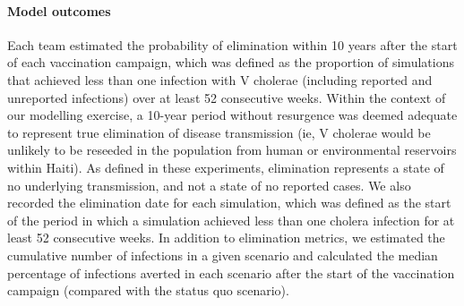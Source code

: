       \paragraph{Model outcomes}
      Each team estimated the probability of elimination within 10 years after the start of each vaccination campaign, which was defined as the proportion of simulations that achieved less than one infection with V cholerae (including reported and unreported infections) over at least 52 consecutive weeks. Within the context of our modelling exercise, a 10-year period without resurgence was deemed adequate to represent true elimination of disease transmission (ie, V cholerae would be unlikely to be reseeded in the population from human or environmental reservoirs within Haiti). As defined in these experiments, elimination represents a state of no underlying transmission, and not a state of no reported cases. We also recorded the elimination date for each simulation, which was defined as the start of the period in which a simulation achieved less than one cholera infection for at least 52 consecutive weeks. In addition to elimination metrics, we estimated the cumulative number of infections in a given scenario and calculated the median percentage of infections averted in each scenario after the start of the vaccination campaign (compared with the status quo scenario).
